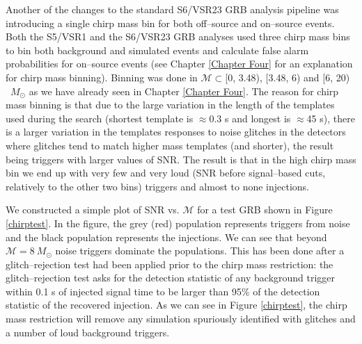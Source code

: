 Another of the changes to the standard S6/VSR23 GRB analysis pipeline was introducing a single chirp mass bin for both off--source and on--source events. Both the S5/VSR1 and the S6/VSR23 GRB analyses used three chirp mass bins to bin both background and simulated events and calculate false alarm probabilities for on--source events (see Chapter \ref{Chapter Four} for an explanation for chirp mass binning). Binning was done in $\mathcal{M} \subset$[0, 3.48), [3.48, 6) and [6, 20) ~$M_{\odot}$ as we have already seen in Chapter \ref{Chapter Four}. The reason for chirp mass binning is that due to the large variation in the length of the templates used during the search (shortest template is $\approx$0.3 s and longest is $\approx$45 s), there is a larger variation in the templates responses to noise glitches in the detectors where glitches tend to match higher mass templates (and shorter), the result being triggers with larger values of SNR. The result is that in the high chirp mass bin we end up with very few and very loud (SNR before signal--based cuts, relatively to the other two bins) triggers and almost to none injections.

We constructed a simple plot of SNR vs. $\mathcal{M}$ for a test GRB shown in Figure \ref{chirptest}. In the figure, the grey (red) population represents triggers from noise and the black population represents the injections. We can see that beyond $\mathcal{M}=8~M_{\odot}$ noise triggers dominate the populations. This has been done after a glitch--rejection test had been applied prior to the chirp mass restriction: the glitch--rejection test asks for the detection statistic of any background trigger within 0.1 s of injected signal time to be larger than 95\% of the detection statistic of the recovered injection. As we can see in Figure \ref{chirptest}, the chirp mass restriction will remove any simulation spuriously identified with glitches and a number of loud background triggers.

